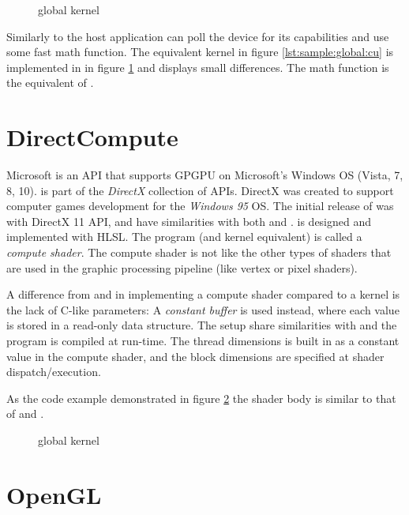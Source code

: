 \begin{figure}
	\centering
	\fbox{}
	\caption{{\OCL} global kernel}
	\label{lst:sample:global:ocl}	
\end{figure}

Similarly to {\CU} the host application can poll the device for its capabilities and use some fast math function. The equivalent {\CU} kernel in figure \ref{lst:sample:global:cu} is implemented in {\OCL} in figure \ref{lst:sample:global:ocl} and displays small differences. The {\OCL} math function  is the equivalent of .

\section{DirectCompute}

Microsoft {\DX} is an \gls{API} that supports \gls{GPGPU} on Microsoft's Windows \gls{OS} (Vista, 7, 8, 10). {\DX} is part of the \emph{DirectX} collection of APIs. DirectX was created to support computer games development for the \emph{Windows 95} OS. The initial release of {\DX} was with DirectX 11 \gls{API}, and have similarities with both {\CU} and {\OCL}. {\DX} is designed and implemented with \gls{HLSL}. The program (and kernel equivalent) is called a \emph{compute shader}. The compute shader is not like the other types of shaders that are used in the graphic processing pipeline (like vertex or pixel shaders).

A difference from {\CU} and {\OCL} in implementing a compute shader compared to a kernel is the lack of C-like parameters: A \emph{constant buffer} is used instead, where each value is stored in a read-only data structure. The setup share similarities with {\OCL} and the program is compiled at run-time. The thread dimensions is built in as a constant value in the compute shader, and the block dimensions are specified at shader dispatch/execution.

As the code example demonstrated in figure \ref{lst:sample:global:dx} the shader body is similar to that of {\CU} and {\OCL}.

\begin{figure}
	\centering
	\fbox{}
	\caption{{\DX} global kernel}
	\label{lst:sample:global:dx}	
\end{figure}

\section{OpenGL}

